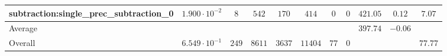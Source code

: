 \begin{tabular}{|l|c|c|c|c|c|c|c|c|c|c|}
subtraction:single\_prec\_subtraction\_0         & $ 1.900 \cdot 10^{-2} $ & $ 8      $ & $ 542  $ & $ 170  $ & $ 414   $ & $ 0  $ & $ 0 $ & $ 421.05      $ & $ 0.12    $ & $ 7.07    $ \\
\hline
Average                                          & $                     $ & $        $ & $      $ & $      $ & $       $ & $    $ & $   $ & $ 397.74      $ & $ -0.06   $ & $         $ \\
\hline
Overall                                          & $ 6.549 \cdot 10^{-1} $ & $ 249    $ & $ 8611 $ & $ 3637 $ & $ 11404 $ & $ 77 $ & $ 0 $ & $             $ & $         $ & $ 77.77   $ \\
\hline
\end{tabular}
